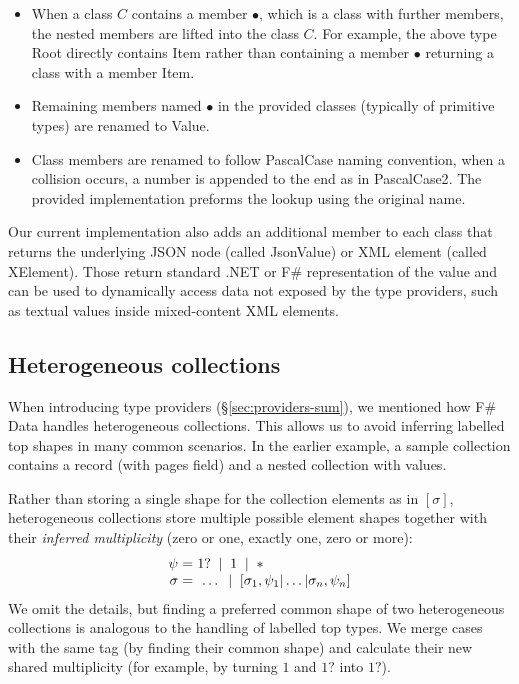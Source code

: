 \documentclass[10pt]{sigplanconf}
\newcommand{\strf}[1]{\textnormal{\textcolor{strclr}{\sffamily #1}}}
\newcommand{\ident}[1]{\textnormal{\sffamily #1}}
\newcommand{\lsep}[0]{\;\; | \;\;}
\newcommand{\narrow}[1]{\hspace{-0.7em} #1 \hspace{-0.7em}}
\begin{document}
\begin{itemize}
\item When a class $C$ contains a member $\bullet$, which is a class with further members, the
  nested members are lifted into the class $C$. For example, the above type \ident{Root}
  directly contains \ident{Item} rather than containing a member $\bullet$ returning a 
  class with a member \ident{Item}.

\item Remaining members named $\bullet$ in the provided classes (typically of primitive
  types) are renamed to \ident{Value}.
  
\item Class members are renamed to follow \ident{PascalCase} naming convention, when a 
  collision occurs, a number is appended to the end as in \ident{PascalCase2}. The provided
  implementation preforms the lookup using the original name.
\end{itemize}

Our current implementation also adds an additional member to each class that returns the
underlying JSON node (called \ident{JsonValue}) or XML element (called \ident{XElement}). 
Those return standard .NET or F\# representation of the value and can be used to dynamically 
access data not exposed by the type providers, such as textual values inside mixed-content XML elements.


\subsection{Heterogeneous collections} 
\label{sec:impl-hetero}

When introducing type providers (\S\ref{sec:providers-sum}), we mentioned how F\# Data 
handles heterogeneous collections. This allows us to avoid inferring 
labelled top shapes in many common scenarios. In the earlier example, a sample collection 
contains a record (with \strf{pages} field) and a nested collection with values.

Rather than storing a single shape for the collection elements as in $[\sigma]$, heterogeneous
collections store multiple possible element shapes together with their \emph{  inferred multiplicity} 
(zero or one, exactly one, zero or more):
%
\begin{equation*}
\begin{array}{rcl}
 \psi &\narrow{=}& 1? \lsep 1 \lsep \ast \\
 \sigma &\narrow{=}& ~\ldots \lsep [\sigma_1, \psi_1 | \ldots | \sigma_n, \psi_n ]
\end{array}
\end{equation*}
%
We omit the details, but finding a preferred common shape of two heterogeneous 
collections is analogous to the handling of labelled top types. We merge cases with the same tag (by finding 
their common shape) and calculate their new shared multiplicity (for example, by turning 
$1$ and $1?$ into $1?$).
\end{document}
